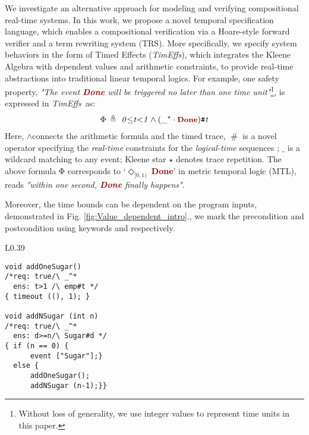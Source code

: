 \documentclass[acmsmall,10pt,review]{acmart}
\newcommand{\timedEffects}{\emph{TimEffs}}
\newcommand{\effect}{{\ensuremath{\mathrm{\Phi}}}}
\newcommand{\anyevent}[1]{{\textcolor{darkred}
{{\textbf{\small #1}}}}}
\newcommand{\code}[1]{{\tt{\ensuremath{\m{#1}}}}}
\newcommand{\m}{\mathit}
\newcommand{\mysharp}{{\mathrel{\texttt{\#}}}}
\def\defeq{\ensuremath{\,\triangleq}}
\newcommand\figref[1]{Fig. \textcolor{black}{\ref{#1}}.}
\begin{document}
We investigate an alternative approach for modeling and verifying 
compositional real-time systems. In this work, 
we propose a novel temporal specification language, 
which enables a compositional verification via a  Hoare-style 
forward verifier and a term rewriting system (TRS). 
More specifically, we specify system behaviors in the form of 
{Timed Effects} (\timedEffects), which integrates the Kleene Algebra 
with dependent values and arithmetic constraints, 
to 
provide real-time abstractions into traditional linear temporal logics. 
For example, one safety property, \textit{"The event \anyevent{Done} 
will be triggered no later than one time unit"}\footnote{Without loss of generality, 
we use integer values to represent time units in this 
paper.%
}, is expressed in \timedEffects\ as: 
\begin{align*}
  \code{\effect \defeq \  0 {\leq} t {<}1 \wedge ({\_^\star} \cdot \anyevent{Done} ) \mysharp  t}
\end{align*}  
Here, \code \wedge  connects the arithmetic formula and the timed trace, \code{\mysharp } is a novel operator specifying the \emph{real-time} 
constraints for the \emph{logical-time} sequences \cite{DBLP:conf/fdl/HanxledenBG17}; 
\code{\_} is a wildcard matching to any event; 
Kleene star \code{\star} denotes trace repetition.
The above formula \code{\effect} corresponds to `\code{\Diamond_{[0, 1)}\ }\anyevent{Done}' 
in metric temporal logic (MTL), reads \textit{"within one second, 
\anyevent{Done} finally happens"}. 

Moreover, the time bounds 
can be dependent on the program inputs, demonstrated in \figref{fig:Value_dependent_intro}, we mark the precondition and postcondition
using keywords {\color{darklavender}\code{\emph{req:}}} and {\color{darklavender}\code{\emph{ens:}}} respectively. 


\begin{wrapfigure}{L}{0.39\columnwidth}
\begin{lstlisting}[name=coffee]
void addOneSugar() 
/*req: true/\ _^*
  ens: t>1 /\ emp#t */ 
{ timeout ((), 1); }

void addNSugar (int n) 
/*req: true/\ _^*
  ens: d>=n/\ Sugar#d */
{ if (n == 0) { 
      event ["Sugar"];} 
  else {
      addOneSugar();
      addNSugar (n-1);}} 
\end{lstlisting}
\caption{Value-dependent specification.} 
\label{fig:Value_dependent_intro}
\vspace{0mm}
\end{wrapfigure}
\end{document}
